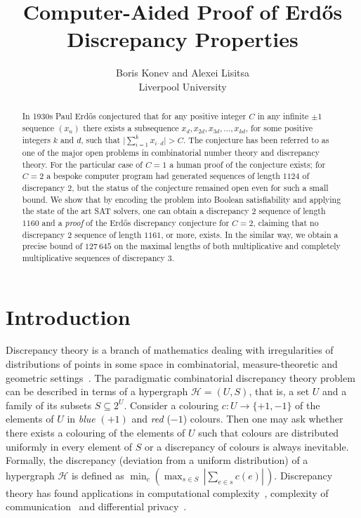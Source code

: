 \documentclass{article} \usepackage[utf8]{inputenc}
\begin{document}
\title{Computer-Aided Proof of Erd\H{o}s Discrepancy Properties}
\author{Boris Konev    and
Alexei Lisitsa \\{Liverpool University}
}

\date{}
\maketitle


\begin{abstract}
In 1930s Paul Erd\H{o}s conjectured that for any positive integer $C$ in any
infinite $\pm 1$ sequence $(x_n)$ there exists a subsequence $x_d, x_{2d},
x_{3d},\dots, x_{kd}$, for some positive integers $k$ and $d$, such that
$\mid \sum_{i=1}^k x_{i\cdot d} \mid >C$.  
The conjecture has been referred to  as one of the major open problems in 
combinatorial number theory and discrepancy theory.  
For the particular case of $C=1$ a human proof of the conjecture exists; for
$C=2$ a bespoke computer program had generated sequences of length $1124$
of discrepancy $2$,
but the status of the conjecture remained open even for such a small bound.
We show that by encoding the problem into Boolean satisfiability and applying the 
state of the art SAT solvers, one can obtain a discrepancy $2$ sequence of length $1160$
and a \emph{proof} of the Erd\H{o}s discrepancy conjecture for
$C=2$, claiming that no discrepancy 2 sequence of length $1161$, or more, exists.    
In the similar way, we obtain a precise bound of $127\,645$ on the maximal
lengths of both multiplicative and completely multiplicative sequences of discrepancy
$3$.
\end{abstract}
\section{Introduction}
Discrepancy theory is a branch of mathematics dealing with 
irregularities of distributions of points in some space in combinatorial, measure-theoretic
and geometric settings~\cite{Beck,Chazelle,Matusek,BeckSos}. 
The paradigmatic combinatorial discrepancy theory  problem can be described in
terms of a hypergraph $\mathcal{H} = (U,S)$, that is, a set $U$  and a family
of its subsets $S \subseteq 2^{U}$. 
Consider a colouring $c : U \rightarrow \{+1,-1\}$ of the elements of $U$ in  
\emph{blue} $(+1)$ and \emph{red}  ($-1$) colours. Then one may ask whether there 
exists a colouring of the elements of ${U}$ such that colours are
distributed uniformly in every element of $S$ or a discrepancy of colours is always inevitable.
Formally, the discrepancy (deviation from a uniform distribution) of a hypergraph $\mathcal{H}$ is defined as
$\min_{c} (\max_{s \in S} \,| \sum_{e \in s} c(e) |\,)$.
Discrepancy theory has found applications 
in {computational complexity}~\cite{Chazelle},
complexity of communication~\cite{DBLP:journals/dam/Alon92}
and {differential privacy}~\cite{Muthukrishnan:2012:OPH:2213977.2214090}. 
\end{document}

